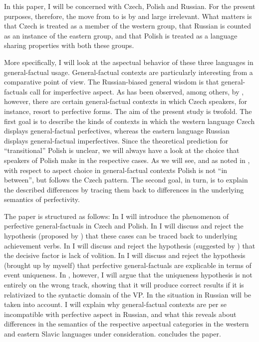 \documentclass[output=paper,
modfonts,
newtxmath,
hidelinks
]{langscibook}
\begin{document}
In this paper, I will be concerned with Czech, Polish and Russian. 
For the present purposes, therefore, the move from \citet{Dickey2000} to \citet{Dickey15} is by and large irrelevant. 
What matters is that Czech is treated as a member of 
the western group, that Russian is counted as an instance of the eastern group, 
and that Polish is treated as a language sharing properties with both these groups.

More specifically, I will look at the aspectual behavior of these three languages in general-factual usage.
General-factual contexts are particularly interesting from a comparative point of view.
The Russian-biased general wisdom is that general-factuals call for imperfective aspect. As has been observed, among others, by \citet{Dickey2000}, however, 
there are certain general-factual contexts in which Czech speakers, for instance, resort to perfective forms.  
The aim of the present study is twofold. The first goal is to describe the kinds of contexts in which the western language Czech displays general-factual perfectives, whereas 
the eastern language Russian displays general-factual imperfectives. Since the theoretical prediction for ``transitional'' Polish is unclear, 
we will always have a look at the choice that speakers of Polish 
make in the respective cases. As we will see, and as noted in 
\citet[101]{Dickey2000}, with respect to aspect choice in general-factual contexts Polish is not ``in between'', but 
follows the Czech pattern.  
The second goal, in turn, is to explain the described differences by tracing them back to differences in the underlying 
semantics of perfectivity. 

The paper is structured as follows: 
In  I will introduce the phenomenon of perfective general-factuals in Czech and Polish. 
In  I will discuss and reject the hypothesis (proposed by \citealt{Dickey2000}) that these cases can be traced back to underlying achievement verbs. 
In  I will discuss and reject the hypothesis (suggested by \citealt{Cummins1987}) that the decisive factor is lack of volition. 
In  I will discuss and reject the hypothesis (brought up by myself) that perfective general-factuals are explicable in terms of event uniqueness.
In , however, I will argue that the uniqueness hypothesis is not entirely on the wrong track, showing that 
it will produce correct results if it is relativized to the syntactic domain of the VP.
In  the situation in Russian will be taken into account. I will explain why general-factual contexts are per se incompatible
with perfective aspect in Russian, and what this reveals about differences in the semantics of the respective aspectual categories
in the western and eastern Slavic languages under consideration. 
 concludes the paper. 
\end{document}
